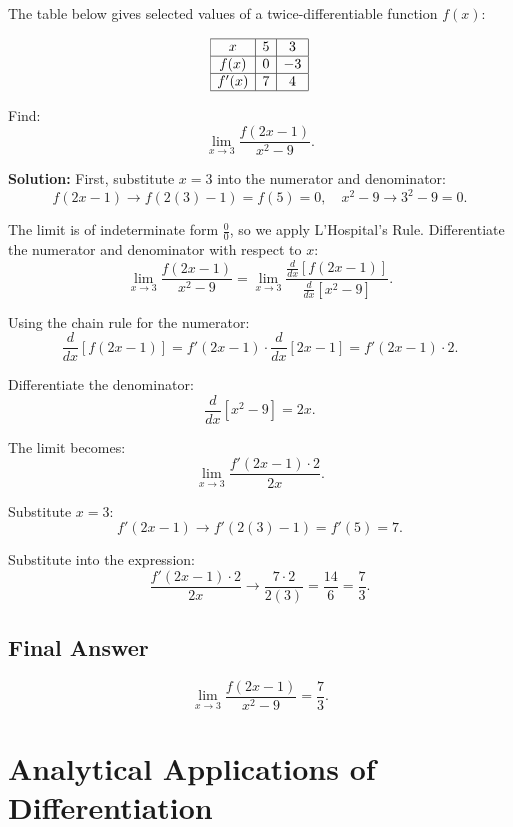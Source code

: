 \documentclass[12pt]{article}
\theoremstyle{beautifulthm}
\begin{document}
\begin{tcolorbox}[colback=examplebg, colframe=red!75!black, title=\textbf{EXAMPLE 3: Using L'hospital to find the Limit}, fonttitle=\bfseries, sharp corners]

The table below gives selected values of a twice-differentiable function \( f(x) \):

\[
\begin{array}{|c|c|c|}
\hline
x & 5 & 3 \\ \hline
f(x) & 0 & -3 \\ \hline
f'(x) & 7 & 4 \\ \hline
\end{array}
\]

Find:
\[
\lim_{x \to 3} \frac{f(2x - 1)}{x^2 - 9}.
\]


\tcblower
\textbf{Solution:} 
First, substitute \( x = 3 \) into the numerator and denominator:
\[
f(2x - 1) \to f(2(3) - 1) = f(5) = 0, \quad x^2 - 9 \to 3^2 - 9 = 0.
\]

The limit is of indeterminate form \( \frac{0}{0} \), so we apply L'Hospital's Rule. Differentiate the numerator and denominator with respect to \( x \):
\[
\lim_{x \to 3} \frac{f(2x - 1)}{x^2 - 9} = \lim_{x \to 3} \frac{\frac{d}{dx}[f(2x - 1)]}{\frac{d}{dx}[x^2 - 9]}.
\]

Using the chain rule for the numerator:
\[
\frac{d}{dx}[f(2x - 1)] = f'(2x - 1) \cdot \frac{d}{dx}[2x - 1] = f'(2x - 1) \cdot 2.
\]

Differentiate the denominator:
\[
\frac{d}{dx}[x^2 - 9] = 2x.
\]

The limit becomes:
\[
\lim_{x \to 3} \frac{f'(2x - 1) \cdot 2}{2x}.
\]

Substitute \( x = 3 \):
\[
f'(2x - 1) \to f'(2(3) - 1) = f'(5) = 7.
\]

Substitute into the expression:
\[
\frac{f'(2x - 1) \cdot 2}{2x} \to \frac{7 \cdot 2}{2(3)} = \frac{14}{6} = \frac{7}{3}.
\]

\subsection*{Final Answer}
\[
\lim_{x \to 3} \frac{f(2x - 1)}{x^2 - 9} = \frac{7}{3}.
\]

\end{tcolorbox}








\newpage
\section{Analytical Applications of Differentiation}
\newpage
\end{document}
